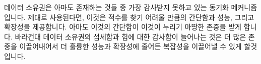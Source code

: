 데이터 소유권은 아마도 존재하는 것들 중 가장 감사받지 못하고 있는 동기화
메커니즘입니다.
제대로 사용된다면, 이것은 적수를 찾기 어려울 만큼의 간단함과 성능, 그리고
확장성을 제공합니다.
아마도 이것의 간단함이 이것이 누리기 마땅한 존중을 받게 합니다.
바라건대 데이터 소유권의 섬세함과 힘에 대한 감사함이 늘어나는 것은 더 많은
존중을 이끌어내어서 더 훌륭한 성능과 확장성에 줄어든 복잡성을 이끌어낼 수 있게
할것입니다.
\iffalse

Data ownership is perhaps the most underappreciated synchronization
mechanism in existence.
When used properly, it delivers unrivaled simplicity, performance,
and scalability.
Perhaps its simplicity costs it the respect that it deserves.
Hopefully a greater appreciation for the subtlety and power of data ownership
will lead to greater level of respect, to say nothing of leading to
greater performance and scalability coupled with reduced complexity.
\fi

